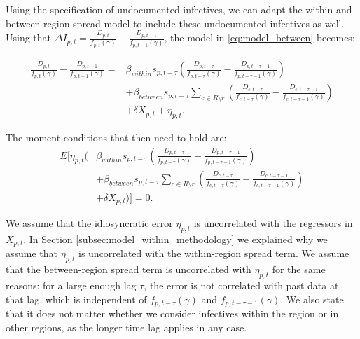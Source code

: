 \documentclass[12pt]{article}
\begin{document}
	Using the specification of undocumented infectives, we can adapt the within and between-region spread model to include these undocumented infectives as well. Using that $\Delta I_{p,t} = \frac{D_{p,t}}{f_{p,t}(\gamma)} - \frac{D_{p,t-1}}{f_{p,t-1}(\gamma)}$, the model in \eqref{eq:model_between} becomes:
	
	    \begin{equation} \label{eq:model_between_undocumented}
            \begin{split}
        		\frac{D_{p,t}}{f_{p,t}(\gamma)} - \frac{D_{p,t-1}}{f_{p,t-1}(\gamma)} = &\beta_{within}s_{p,t-\tau}\left(\frac{D_{p,t-\tau}}{f_{p,t-\tau}(\gamma)} - \frac{D_{p,t-\tau-1}}{f_{p,t-\tau-1}(\gamma)}\right) \\
    		    &+ \beta_{between}s_{p,t-\tau} \sum_{c \in R \setminus r} \left(\frac{D_{c,t-\tau}}{f_{c,t-\tau}(\gamma)} - \frac{D_{c,t-\tau-1}}{f_{c,t-\tau-1}(\gamma)} \right) \\
    		    &+ \delta X_{p,t} + \eta_{p,t}.
    		\end{split}
        \end{equation}
	    
	\noindent The moment conditions that then need to hold are:
	    \begin{equation} \label{eq:model_between_undocumented_moments}
            \begin{split}
    	        E\Bigg[ \eta_{p,t}\Bigg( &\beta_{within}s_{p,t-\tau}\left(\frac{D_{p,t-\tau}}{f_{p,t-\tau}(\gamma)} - \frac{D_{p,t-\tau-1}}{f_{p,t-\tau-1}(\gamma)}\right) \\
    	        &+ \beta_{between}s_{p,t-\tau} \sum_{c \in R \setminus r} \left(\frac{D_{c,t-\tau}}{f_{c,t-\tau}(\gamma)} - \frac{D_{c,t-\tau-1}}{f_{c,t-\tau-1}(\gamma)} \right) \\
    	        &+ \delta X_{p,t} \Bigg) \Bigg] = 0.
	        \end{split}
        \end{equation}
	
	We assume that the idiosyncratic error $\eta_{p,t}$ is uncorrelated with the regressors in $X_{p,t}$. In Section \ref{subsec:model_within_methodology} we explained why we assume that $\eta_{p,t}$ is uncorrelated with the within-region spread term. We assume that the between-region spread term is uncorrelated with $\eta_{p,t}$ for the same reasons: for a large enough lag $\tau$, the error is not correlated with past data at that lag, which is independent of $f_{p,t-\tau}(\gamma)$ and $f_{p,t-\tau-1}(\gamma)$. We also state that it does not matter whether we consider infectives within the region or in other regions, as the longer time lag applies in any case.
	
\end{document}
